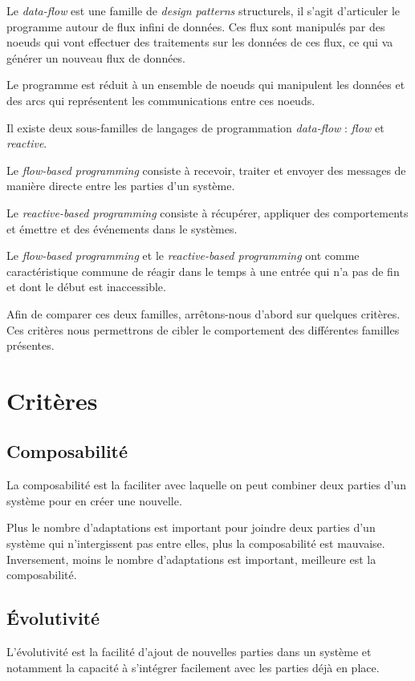 \documentclass{article}
\begin{document}
Le \emph{data-flow} est une famille de \emph{design patterns} structurels,
il s'agit d'articuler le programme autour de flux infini de données.
Ces flux sont manipulés par des noeuds qui vont effectuer des traitements sur
les données de ces flux, ce qui va générer un nouveau flux de données.

Le programme est réduit à un ensemble de noeuds qui
manipulent les données et des arcs qui représentent les
communications entre ces noeuds.

Il existe deux sous-familles de langages de programmation \emph{data-flow} :
\emph{flow} et \emph{reactive}.

Le \emph{flow-based programming} consiste à recevoir, traiter et envoyer des messages de
manière directe entre les parties d'un système.

Le \emph{reactive-based programming} consiste à récupérer, appliquer des comportements
et émettre et des événements dans le systèmes.

Le \emph{flow-based programming} et le \emph{reactive-based programming} ont comme
caractéristique commune de réagir dans le temps à une entrée qui n'a pas de fin et
dont le début est inaccessible.

Afin de comparer ces deux familles, arrêtons-nous d'abord sur quelques critères.
Ces critères nous permettrons de cibler le comportement des différentes familles présentes.

\section{Critères}\label{criteres}
\subsection{Composabilité}
La composabilité est la faciliter avec laquelle on peut combiner deux parties d'un
système pour en créer une nouvelle.

Plus le nombre d'adaptations est important pour joindre deux parties
d'un système qui n'intergissent pas entre elles, plus la composabilité est mauvaise.
Inversement, moins le nombre d'adaptations est important, meilleure est la composabilité.

\subsection{Évolutivité}
L'évolutivité est la facilité d'ajout de nouvelles parties dans un système et notamment
la capacité à s'intégrer facilement avec les parties déjà en place.
\end{document}
